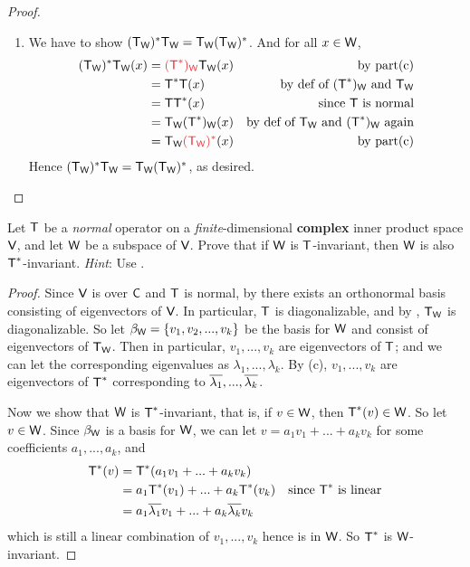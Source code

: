\begin{proof}
\begin{enumerate}
\item We have to show \((\textsf{T}_{\textsf{W}})^* \textsf{T}_{\textsf{W}} = \textsf{T}_{\textsf{W}} (\textsf{T}_{\textsf{W}})^*\).
And for all \(x \in \textsf{W}\),
\begin{align*}
    (\T_\W)^* \T_\W(x) & = \RED{(\T^*)_\W} \T_\W(x) & \text{by part(c)} \\
        & = \T^* \T (x) & \text{by def of \((\T^*)_\W\) and \(\T_\W\)} \\
        & = \T \T^* (x) & \text{since \(\T\) is normal} \\
        & = \T_\W (\T^*)_\W (x) & \text{by def of \(\T_\W\) and \((\T^*)_\W\) again} \\
        & = \T_\W \RED{(\T_\W)^*} (x) & \text{by part(c)}
\end{align*}
Hence \((\textsf{T}_{\textsf{W}})^* \textsf{T}_{\textsf{W}} = \textsf{T}_{\textsf{W}} (\textsf{T}_{\textsf{W}})^*\), as desired.
\end{enumerate}
\end{proof}

\begin{exercise} \label{exercise 6.4.8}
Let \(\textsf{T}\) be a \emph{normal} operator on a \emph{finite}-dimensional \textbf{complex} inner product space \(\textsf{V}\), and let \(\textsf{W}\) be a subspace of \(\textsf{V}\).
Prove that if \(\textsf{W}\) is \(\textsf{T}\)-invariant, then \(\textsf{W}\) is also \(\textsf{T}^*\)-invariant.
\emph{Hint}: Use .
\end{exercise}

\begin{proof}
Since \(\textsf{V}\) is over \(\textsf{C}\) and \(\textsf{T}\) is normal, by  there exists an orthonormal basis consisting of eigenvectors of \(\textsf{V}\).
In particular, \(\textsf{T}\) is diagonalizable, and by , \(\textsf{T}_{\textsf{W}}\) is diagonalizable.
So let \(\beta_{\textsf{W}} = \{ v_1, v_2, ..., v_k \}\) be the basis for \(\textsf{W}\) and consist of eigenvectors of \(\textsf{T}_{\textsf{W}}\).
Then in particular, \(v_1, ..., v_k\) are eigenvectors of \(\textsf{T}\); and we can let the corresponding eigenvalues as \(\lambda_1, ..., \lambda_k\).
By (c), \(v_1, ..., v_k\) are eigenvectors of \(\textsf{T}^*\) corresponding to \(\overline{\lambda_1}, ..., \overline{\lambda_k}\).

Now we show that \(\textsf{W}\) is \(\textsf{T}^*\)-invariant, that is, if \(v \in \textsf{W}\), then \(\textsf{T}^*(v) \in \textsf{W}\).
So let \(v \in \textsf{W}\).
Since \(\beta_{\textsf{W}}\) is a basis for \(\textsf{W}\), we can let \(v = a_1 v_1 + ... + a_k v_k\) for some coefficients \(a_1, ..., a_k\), and
\begin{align*}
    \textsf{T}^*(v) & = \textsf{T}^*(a_1 v_1 + ... + a_k v_k) \\
        & = a_1 \textsf{T}^* (v_1) + ... + a_k \textsf{T}^* (v_k) & \text{since \(\textsf{T}^*\) is linear} \\
        & = a_1 \overline{\lambda_1} v_1 + ... + a_k \overline{\lambda_k} v_k
\end{align*}
which is still a linear combination of \(v_1, ..., v_k\) hence is in \(\textsf{W}\).
So \(\textsf{T}^*\) is \(\textsf{W}\)-invariant.
\end{proof}

